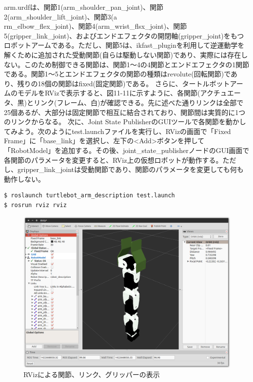 arm.urdfは、関節1(arm\_shoulder\_pan\_joint)、関節2(arm\_shoulder\_lift\_joint)、関節3(a\\rm\_elbow\_flex\_joint)、関節4(arm\_wrist\_flsx\_joint)、関節5(gripper\_link\_joint)、およびエンドエフェクタの開閉軸(gripper\_joint)をもつロボットアームである。ただし、関節5は、ikfast\_pluginを利用して逆運動学を解くために追加された受動関節(自らは駆動しない関節)であり、実際には存在しない。このため制御できる関節は、関節1～4の4関節とエンドエフェクタの1関節である。関節1〜5とエンドエフェクタの関節の種類はrevolute(回転関節)であり、残りの18個の関節はfixed(固定関節)である。
さらに、タートルボットアームのモデルをRVizで表示すると、図11-11に示すように、各関節(アクチュエータ、黒)とリンク(フレーム、白)が確認できる。先に述べた通りリンクは全部で25個あるが、大部分は固定関節で相互に結合されており、関節間は実質的に1つのリンクからなる。
次に、Joint State PublisherのGUIツールで各関節を動かしてみよう。次のようにtest.launchファイルを実行し、RVizの画面で「Fixed Frame」に「base\_link」を選択し、左下の<Add>ボタンを押して「RobotModel」を追加する。その後、joint\_state\_publisherノードのGUI画面で各関節のパラメータを変更すると、RViz上の仮想ロボットが動作する。ただし、gripper\_link\_jointは受動関節であり、関節のパラメータを変更しても何も動作しない。

\begin{lstlisting}[language=ROS]
$ roslaunch turtlebot_arm_description test.launch
$ rosrun rviz rviz
\end{lstlisting}

\begin{figure}[htp]
  \centering
  \includegraphics[width=12cm]{pictures/chapter11/pic_11_11.png}
  \caption{RVizによる関節、リンク、グリッパーの表示}
\end{figure}

